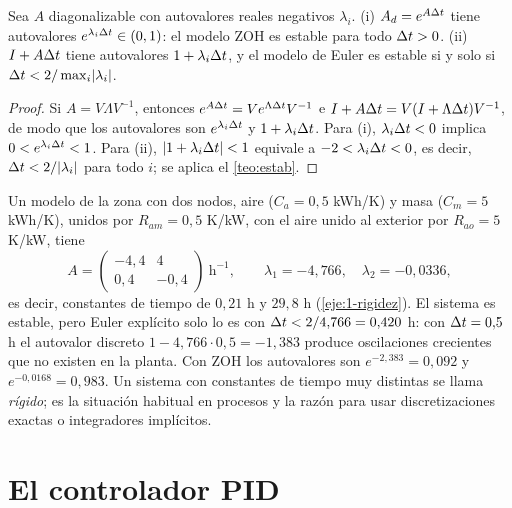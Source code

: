 \begin{corolario}\label{cor:euler}
Sea $A$ diagonalizable con autovalores reales negativos $\lambda_i$. (i) $A_d=e^{A\Delta t}$ tiene autovalores $e^{\lambda_i\Delta t}\in(0,1)$: el modelo ZOH es estable para todo $\Delta t>0$. (ii) $I+A\Delta t$ tiene autovalores $1+\lambda_i\Delta t$, y el modelo de Euler es estable si y solo si $\Delta t<2/\max_i\lvert\lambda_i\rvert$.
\end{corolario}

\begin{proof}
Si $A=V\Lambda V^{-1}$, entonces $e^{A\Delta t}=Ve^{\Lambda\Delta t}V^{-1}$ e $I+A\Delta t=V(I+\Lambda\Delta t)V^{-1}$, de modo que los autovalores son $e^{\lambda_i\Delta t}$ y $1+\lambda_i\Delta t$. Para (i), $\lambda_i\Delta t<0$ implica $0<e^{\lambda_i\Delta t}<1$. Para (ii), $\lvert1+\lambda_i\Delta t\rvert<1$ equivale a $-2<\lambda_i\Delta t<0$, es decir, $\Delta t<2/\lvert\lambda_i\rvert$ para todo $i$; se aplica el \cref{teo:estab}.
\end{proof}

\begin{ejemplo}\label{ej:rigido}
Un modelo de la zona con dos nodos, aire ($C_a=0{,}5$ kWh/K) y masa ($C_m=5$ kWh/K), unidos por $R_{am}=0{,}5$ K/kW, con el aire unido al exterior por $R_{ao}=5$ K/kW, tiene
\[
A=\begin{pmatrix}-4{,}4&4\\0{,}4&-0{,}4\end{pmatrix}\ \mathrm{h}^{-1},\qquad \lambda_1=-4{,}766,\quad \lambda_2=-0{,}0336,
\]
es decir, constantes de tiempo de $0{,}21$ h y $29{,}8$ h (\cref{eje:1-rigidez}). El sistema es estable, pero Euler explícito solo lo es con $\Delta t<2/4{,}766=0{,}420$ h: con $\Delta t=0{,}5$ h el autovalor discreto $1-4{,}766\cdot0{,}5=-1{,}383$ produce oscilaciones crecientes que no existen en la planta. Con ZOH los autovalores son $e^{-2{,}383}=0{,}092$ y $e^{-0{,}0168}=0{,}983$. Un sistema con constantes de tiempo muy distintas se llama \emph{rígido}; es la situación habitual en procesos y la razón para usar discretizaciones exactas o integradores implícitos.
\end{ejemplo}

\section{El controlador PID}

